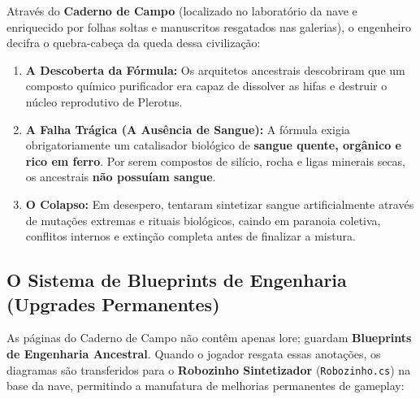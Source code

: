 \documentclass[a4paper,12pt]{report}
\begin{document}
Através do \textbf{Caderno de Campo} (localizado no laboratório da nave e enriquecido por folhas soltas e manuscritos resgatados nas galerias), o engenheiro decifra o quebra-cabeça da queda dessa civilização:
\begin{enumerate}
    \item \textbf{A Descoberta da Fórmula:} Os arquitetos ancestrais descobriram que um composto químico purificador era capaz de dissolver as hifas e destruir o núcleo reprodutivo de Plerotus.
    \item \textbf{A Falha Trágica (A Ausência de Sangue):} A fórmula exigia obrigatoriamente um catalisador biológico de \textbf{sangue quente, orgânico e rico em ferro}. Por serem compostos de silício, rocha e ligas minerais secas, os ancestrais \textbf{não possuíam sangue}.
    \item \textbf{O Colapso:} Em desespero, tentaram sintetizar sangue artificialmente através de mutações extremas e rituais biológicos, caindo em paranoia coletiva, conflitos internos e extinção completa antes de finalizar a mistura.
\end{enumerate}

\subsection{O Sistema de Blueprints de Engenharia (Upgrades Permanentes)}
As páginas do Caderno de Campo não contêm apenas lore; guardam \textbf{Blueprints de Engenharia Ancestral}. Quando o jogador resgata essas anotações, os diagramas são transferidos para o \textbf{Robozinho Sintetizador} (\texttt{Robozinho.cs}) na base da nave, permitindo a manufatura de melhorias permanentes de gameplay:
\end{document}
